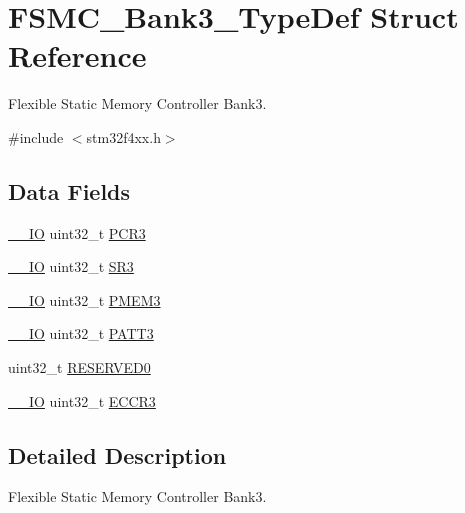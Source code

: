 \hypertarget{struct_f_s_m_c___bank3___type_def}{}\section{F\+S\+M\+C\+\_\+\+Bank3\+\_\+\+Type\+Def Struct Reference}
\label{struct_f_s_m_c___bank3___type_def}


Flexible Static Memory Controller Bank3.  




{\ttfamily \#include $<$stm32f4xx.\+h$>$}

\subsection*{Data Fields}
\begin{DoxyCompactItemize}
\item 
\hyperlink{group___c_m_s_i_s__core__definitions_gaec43007d9998a0a0e01faede4133d6be}{\+\_\+\+\_\+\+IO} uint32\+\_\+t \hyperlink{struct_f_s_m_c___bank3___type_def_a73861fa74b83973fa1b5f92735c042ef}{P\+C\+R3}
\item 
\hyperlink{group___c_m_s_i_s__core__definitions_gaec43007d9998a0a0e01faede4133d6be}{\+\_\+\+\_\+\+IO} uint32\+\_\+t \hyperlink{struct_f_s_m_c___bank3___type_def_af30c34f7c606cb9416a413ec5fa36491}{S\+R3}
\item 
\hyperlink{group___c_m_s_i_s__core__definitions_gaec43007d9998a0a0e01faede4133d6be}{\+\_\+\+\_\+\+IO} uint32\+\_\+t \hyperlink{struct_f_s_m_c___bank3___type_def_aba8981e4f06cfb3db7d9959242052f80}{P\+M\+E\+M3}
\item 
\hyperlink{group___c_m_s_i_s__core__definitions_gaec43007d9998a0a0e01faede4133d6be}{\+\_\+\+\_\+\+IO} uint32\+\_\+t \hyperlink{struct_f_s_m_c___bank3___type_def_aba03fea9c1bb2242d963e29f1b94d25e}{P\+A\+T\+T3}
\item 
uint32\+\_\+t \hyperlink{struct_f_s_m_c___bank3___type_def_af86c61a5d38a4fc9cef942a12744486b}{R\+E\+S\+E\+R\+V\+E\+D0}
\item 
\hyperlink{group___c_m_s_i_s__core__definitions_gaec43007d9998a0a0e01faede4133d6be}{\+\_\+\+\_\+\+IO} uint32\+\_\+t \hyperlink{struct_f_s_m_c___bank3___type_def_a6062be7dc144c07e01c303cb49d69ce2}{E\+C\+C\+R3}
\end{DoxyCompactItemize}


\subsection{Detailed Description}
Flexible Static Memory Controller Bank3. 

